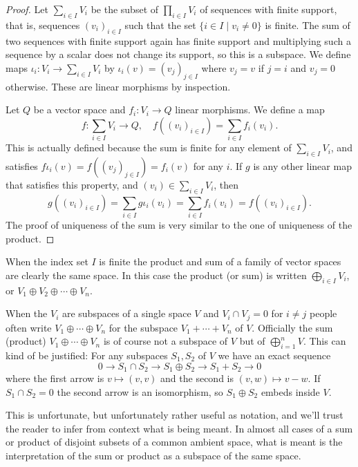\documentclass[11pt]{article}
\theoremstyle{definition}
\begin{document}
\begin{proof}
Let $\sum_{i \in I} V_i$ be the subset of $\prod_{i \in I} V_i$ of sequences with finite support, that is, sequences $(v_i)_{i \in I}$ such that the set $\{ i \in I \mid v_i \not= 0 \}$ is finite.
The sum of two sequences with finite support again has finite support and multiplying such a sequence by a scalar does not change its support, so this is a subspace.
We define maps $\iota_i : V_i \to \sum_{i \in I} V_i$ by $\iota_i(v) = (v_j)_{j \in I}$ where $v_j = v$ if $j = i$ and $v_j = 0$ otherwise.
These are linear morphisms by inspection.

Let $Q$ be a vector space and $f_i : V_i \to Q$ linear morphisms.
We define a map 
\[
f : \sum_{i \in I} V_i \to Q,
\quad
f((v_i)_{i \in I}) = \sum_{i \in I} f_i(v_i).
\]
This is actually defined because the sum is finite for any element of $\sum_{i \in I} V_i$, and satisfies $f\iota_i(v) = f((v_j)_{j \in I}) = f_i(v)$ for any $i$.
If $g$ is any other linear map that satisfies this property, and $(v_i) \in \sum_{i \in I} V_i$, then
\[
g((v_i)_{i \in I})
= \sum_{i \in I} g \iota_i(v_i)
= \sum_{i \in I} f_i(v_i)
= f((v_i)_{i \in I}).
\]
The proof of uniqueness of the sum is very similar to the one of uniqueness of the product.
\end{proof}


When the index set $I$ is finite the product and sum of a family of vector
spaces are clearly the same space.
In this case the product (or sum) is written $\bigoplus_{i \in I} V_i$, or $V_1 \oplus V_2 \oplus \cdots \oplus V_n$.

When the $V_i$ are subspaces of a single space $V$ and $V_i \cap V_j = 0$ for $i \not= j$ people often write $V_1 \oplus \cdots \oplus V_n$ for the subspace $V_1 + \cdots + V_n$ of $V$.
Officially the sum (product) $V_1 \oplus \cdots \oplus V_n$ is of course not a subspace of $V$ but of $\bigoplus_{i=1}^n V$.
This can kind of be justified:
For any subspaces $S_1, S_2$ of $V$ we have an exact sequence
\[
0 \longrightarrow S_1 \cap S_2 \longrightarrow S_1 \oplus S_2 \longrightarrow S_1 + S_2 \longrightarrow 0
\]
where the first arrow is $v \mapsto (v,v)$ and the second is $(v,w) \mapsto v - w$.
If $S_1 \cap S_2 = 0$ the second arrow is an isomorphism, so $S_1 \oplus S_2$ embeds inside $V$.


This is unfortunate, but unfortunately rather useful as notation, and we'll trust the reader to infer from context what is being meant.
In almost all cases of a sum or product of disjoint subsets of a common ambient space, what is meant is the interpretation of the sum or product as a subspace of the same space.
\end{document}
